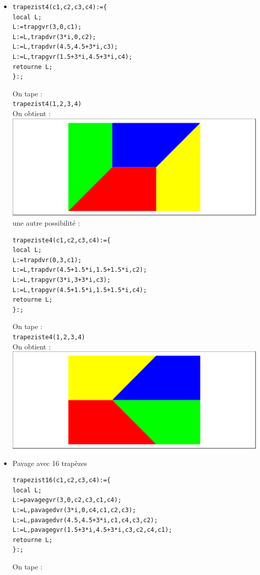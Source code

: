 \documentclass[a4paper,11pt]{book}
\begin{document}
\begin{itemize}
\item
\begin{verbatim}
trapezist4(c1,c2,c3,c4):={
local L;
L:=trapgvr(3,0,c1);
L:=L,trapdvr(3*i,0,c2);
L:=L,trapdvr(4.5,4.5+3*i,c3);
L:=L,trapgvr(1.5+3*i,4.5+3*i,c4);
retourne L;
}:;
\end{verbatim}
On tape :\\
{\tt trapezist4(1,2,3,4)}\\
On obtient :\\
\includegraphics[width=\textwidth]{trapezist4}\\
une autre possibilit\'e :
\begin{verbatim}
trapeziste4(c1,c2,c3,c4):={
local L;
L:=trapdvr(0,3,c1);
L:=L,trapdvr(4.5+1.5*i,1.5+1.5*i,c2);
L:=L,trapgvr(3*i,3+3*i,c3);
L:=L,trapgvr(4.5+1.5*i,1.5+1.5*i,c4);
retourne L;
}:;
\end{verbatim}
On tape :\\
{\tt trapeziste4(1,2,3,4)}\\
On obtient :\\
\includegraphics[width=\textwidth]{trapesiste4}
\item Pavage avec 16 trap\`ezes
\begin{verbatim}
trapezist16(c1,c2,c3,c4):={
local L;
L:=pavagegvr(3,0,c2,c3,c1,c4);
L:=L,pavagedvr(3*i,0,c4,c1,c2,c3);
L:=L,pavagedvr(4.5,4.5+3*i,c1,c4,c3,c2);
L:=L,pavagegvr(1.5+3*i,4.5+3*i,c3,c2,c4,c1);
retourne L;
}:;
\end{verbatim}
On tape :\\

\end{itemize}
\end{document}
